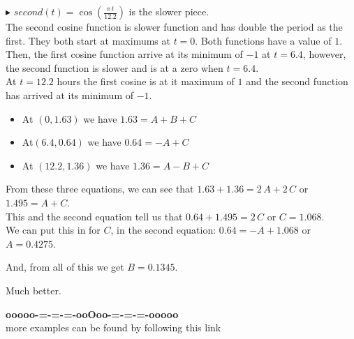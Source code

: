 \documentclass{ximera}
\begin{document}
\textbf{\textcolor{blue!55!black}{$\blacktriangleright$}} $second(t) = \cos\left( \frac{\pi \, t}{12.2} \right)$ is the slower piece. \\




The second cosine function is slower function and has double the period as the first.  They both start at maximums at $t=0$.  Both functions have a value of $1$. \\

Then, the first cosine function arrive at its minimum of $-1$ at $t=6.4$, however, the second function is slower and is at a zero when $t=6.4$.  \\

At $t=12.2$ hours the first cosine is at it maximum of $1$ and the second function has arrived at its minimum of $-1$.






\begin{itemize}
\item At $(0, 1.63)$  we have $1.63 = A + B + C$
\item At$(6.4, 0.64)$ we have $0.64 = -A + C$
\item At $(12.2, 1.36)$  we have $1.36 = A - B + C$
\end{itemize}




From these three equations, we can see that $1.63 + 1.36 = 2 \, A + 2 \, C$   or $1.495 = A + C$.  \\

This and the second equation tell us that $0.64 + 1.495 = 2 \, C$ or $C = 1.068$. \\

We can put this in for $C$, in the second equation: $0.64 = -A + 1.068$ or $A = 0.4275$.

And, from all of this we get $B = 0.1345$.






\begin{center}
\end{center}

Much better.















\begin{center}
\textbf{\textcolor{green!50!black}{ooooo-=-=-=-ooOoo-=-=-=-ooooo}} \\

more examples can be found by following this link\\ 

\end{center}
\end{document}
